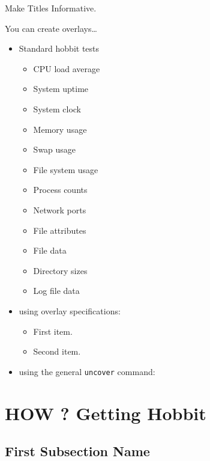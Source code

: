 \documentclass{beamer}
\begin{document}
\begin{frame}{Make Titles Informative.}

  You can create overlays\dots
  \begin{itemize}

  \item Standard hobbit tests
    \begin{itemize}
\item CPU load average
\item System uptime
\item System clock
\item Memory usage
\item Swap usage
\item File system usage
\item Process counts
\item Network ports
\item File attributes
\item File data
\item Directory sizes
\item Log file data

    \end{itemize}

  \item
    using overlay specifications:
    \begin{itemize}
    \item<3->
      First item.
    \item<4->
      Second item.
    \end{itemize}


  \item
    using the general \texttt{uncover} command:
    \begin{itemize}
    \end{itemize}

  \end{itemize}

\end{frame}


\section{HOW ? Getting Hobbit}

\subsection[Short First Subsection Name]{First Subsection Name}
\end{document}
